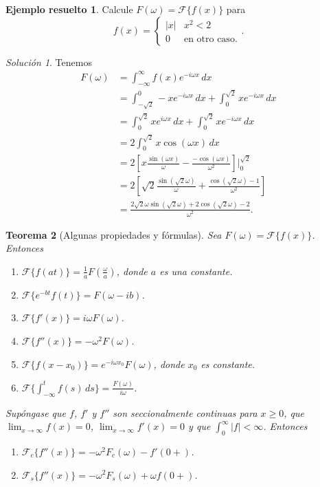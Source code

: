 \documentclass[11pt,letterpaper,draft]{report}
\theoremstyle{plain}
\newtheorem{theorem}{Teorema}[chapter]
\theoremstyle{definition}
\newtheorem{solved}[theorem]{Ejemplo resuelto}
\theoremstyle{remark}
\newtheorem*{solution}{Solución}
\newcommand\<{\langle}
\renewcommand\>{\rangle}
\let\cal\mathcal
\begin{document}
\begin{solved}
  Calcule $F(\omega)=\cal F\{f(x)\}$ para
  \[
    f(x)
    =
    \begin{cases}
      |x| & x^{2}<2 \\
      0 & \text{en otro caso.}
    \end{cases}
  .\]
  \begin{solution}
    Tenemos
    \begin{align*}
      F(\omega)
      &= \int_{-\infty}^{\infty}f(x)e^{-i\omega x}\,dx \\
      &= \int_{-\sqrt 2}^{0}-xe^{-i\omega x}\,dx
        + \int_{0}^{\sqrt 2}xe^{-i\omega x}\,dx \\
      &= \int_{0}^{\sqrt 2}xe^{i\omega x}\,dx
        + \int_{0}^{\sqrt 2}xe^{-i\omega x}\,dx \\
      &= 2\int_{0}^{\sqrt 2}x\cos(\omega x)\,dx \\
      &= 2\left[
        x\frac{\sin(\omega x)}{\omega}-\frac{-\cos(\omega
        x)}{\omega^{2}}
      \right]\Big|_{0}^{\sqrt 2} \\
      &= 2\left[
        \sqrt 2\frac{\sin(\sqrt 2\omega)}{\omega}
        +\frac{\cos(\sqrt 2\omega)-1}{\omega^{2}}
      \right] \\
      &=
        \frac{2\sqrt 2\omega\sin(\sqrt 2\omega)+2\cos(\sqrt 2\omega)-2}
        {\omega^{2}}.
    \end{align*}
  \end{solution}
\end{solved}

\begin{theorem}[Algunas propiedades y fórmulas]
  Sea $F(\omega)=\cal F\{f(x)\}$.
  Entonces
  \begin{enumerate}
    \item $\cal F\{f(at)\}=\frac{1}{a}F(\frac{\omega}{a})$, donde $a$
      es una constante.
    \item $\cal F\{e^{-bt}f(t)\}=F(\omega-ib)$.
    \item $\cal F\{f'(x)\}=i\omega F(\omega)$.
    \item $\cal F\{f''(x)\}=-\omega^{2}F(\omega)$.
    \item $\cal F\{f(x-x_0)\}=e^{-i\omega x_0}F(\omega)$, donde $x_0$
      es constante.
    \item $\cal
      F\{\int_{-\infty}^{t}f(s)\,ds\}=\frac{F(\omega)}{i\omega}$.
  \end{enumerate}
  Supóngase que $f$, $f'$ y $f''$ son seccionalmente continuas para
  $x\geq 0$, que $\lim_{x\to\infty}f(x)=0$,
  $\lim_{x\to\infty}f'(x)=0$ y que $\int_{0}^{\infty}|f|<\infty$.
  Entonces
  \begin{enumerate}
    \item $\cal F_c\{f''(x)\}=-\omega^{2}F_c(\omega)-f'(0+)$.
    \item $\cal F_s\{f''(x)\}=-\omega^{2}F_s(\omega)+\omega f(0+)$.
  \end{enumerate}
\end{theorem}
\end{document}
